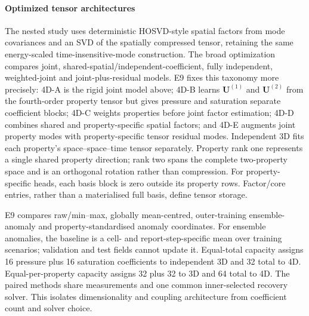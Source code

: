 \paragraph{Optimized tensor architectures} The nested study uses deterministic HOSVD-style spatial factors from mode covariances and an SVD of the spatially compressed tensor, retaining the same energy-scaled time-insensitive-mode construction. The broad optimization compares joint, shared-spatial/independent-coefficient, fully independent, weighted-joint and joint-plus-residual models. E9 fixes this taxonomy more precisely: 4D-A is the rigid joint model above; 4D-B learns $\mathbf U^{(1)}$ and $\mathbf U^{(2)}$ from the fourth-order property tensor but gives pressure and saturation separate coefficient blocks; 4D-C weights properties before joint factor estimation; 4D-D combines shared and property-specific spatial factors; and 4D-E augments joint property modes with property-specific tensor residual modes. Independent 3D fits each property's space--space--time tensor separately. Property rank one represents a single shared property direction; rank two spans the complete two-property space and is an orthogonal rotation rather than compression. For property-specific heads, each basis block is zero outside its property rows. Factor/core entries, rather than a materialised full basis, define tensor storage.

E9 compares raw/min--max, globally mean-centred, outer-training ensemble-anomaly and property-standardised anomaly coordinates. For ensemble anomalies, the baseline is a cell- and report-step-specific mean over training scenarios; validation and test fields cannot update it. Equal-total capacity assigns 16 pressure plus 16 saturation coefficients to independent 3D and 32 total to 4D. Equal-per-property capacity assigns 32 plus 32 to 3D and 64 total to 4D. The paired methods share measurements and one common inner-selected recovery solver. This isolates dimensionality and coupling architecture from coefficient count and solver choice.

